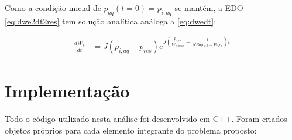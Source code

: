 \documentclass[final,5p]{elsarticle}
\numberwithin{equation}{section}
\begin{document}
        Como a condição inicial de $p_{aq}(t=0)=p_{i,aq}$ se mantém, a EDO \ref{eq:dwe2dt2res} tem solução analítica análoga a \ref{eq:dwedt}:

        \begin{align}
            \frac{dW_e}{dt} &= J (p_{i,aq} - p_{res}) e^{J \left( \frac{p_{i,aq}}{W_{e,max}} + \frac{1}{N Bo_b c_{o,b} + Pv_i c_r} \right)  t} \label{eq:dwedtres}
        \end{align}

\section{Implementação} \label{sec:implementacao}

        Todo o código utilizado nesta análise foi desenvolvido em C++. Foram criados objetos próprios para cada elemento integrante do problema proposto:
\end{document}

